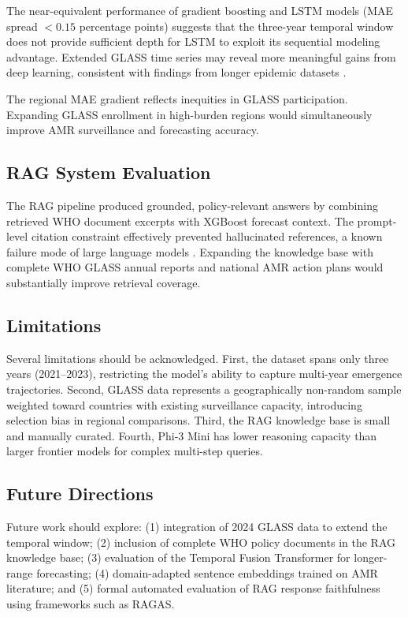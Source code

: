 \documentclass[12pt]{article}
\begin{document}
The near-equivalent performance of gradient boosting and LSTM models (MAE spread $< 0.15$ percentage points) suggests that the three-year temporal window does not provide sufficient depth for LSTM to exploit its sequential modeling advantage. Extended GLASS time series may reveal more meaningful gains from deep learning, consistent with findings from longer epidemic datasets \citep{chimmula2020}.

The regional MAE gradient reflects inequities in GLASS participation. Expanding GLASS enrollment in high-burden regions would simultaneously improve AMR surveillance and forecasting accuracy.

\subsection{RAG System Evaluation}

The RAG pipeline produced grounded, policy-relevant answers by combining retrieved WHO document excerpts with XGBoost forecast context. The prompt-level citation constraint effectively prevented hallucinated references, a known failure mode of large language models \citep{lewis2020}. Expanding the knowledge base with complete WHO GLASS annual reports and national AMR action plans would substantially improve retrieval coverage.

\subsection{Limitations}

Several limitations should be acknowledged. First, the dataset spans only three years (2021--2023), restricting the model's ability to capture multi-year emergence trajectories. Second, GLASS data represents a geographically non-random sample weighted toward countries with existing surveillance capacity, introducing selection bias in regional comparisons. Third, the RAG knowledge base is small and manually curated. Fourth, Phi-3 Mini has lower reasoning capacity than larger frontier models for complex multi-step queries.

\subsection{Future Directions}

Future work should explore: (1) integration of 2024 GLASS data to extend the temporal window; (2) inclusion of complete WHO policy documents in the RAG knowledge base; (3) evaluation of the Temporal Fusion Transformer for longer-range forecasting; (4) domain-adapted sentence embeddings trained on AMR literature; and (5) formal automated evaluation of RAG response faithfulness using frameworks such as RAGAS.
\end{document}
